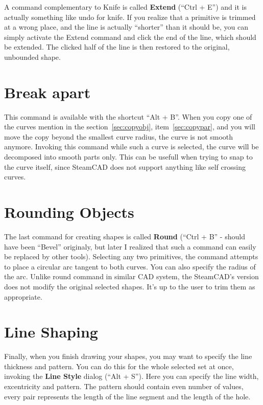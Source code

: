 A command complementary to Knife is called \textbf{Extend} (``Ctrl + E'') and it is
actually something like undo for knife. If you realize that a primitive is trimmed
at a wrong place, and the line is actually ``shorter'' than it should be, you can simply
activate the Extend command and click the end of the line, which should be extended.
The clicked half of the line is then restored to the original, unbounded shape.

\section{Break apart}
This command is available with the shortcut ``Alt + B''. When you copy one of the curves
mention in the section~\ref{sec:copyobj}, item~\ref{sec:copypar}, and you will move the
copy beyond the smallest curve radius, the curve is not smooth anymore. Invoking this
command while such a curve is selected, the curve will be decomposed into smooth parts only.
This can be usefull when trying to snap to the curve itself, since SteamCAD does not support
anything like self crossing curves.

\section{Rounding Objects}

The last command for creating shapes is called \textbf{Round} (``Ctrl + B'' - should have
been ``Bevel'' originaly, but later I realized that such a command can easily be replaced
by other tools). Selecting any two primitives, the command attempts to place a circular
arc tangent to both curves. You can also specify the radius of the arc. Unlike round
command in similar CAD system, the SteamCAD's version does not modify the original
selected shapes. It's up to the user to trim them as appropriate.

\section{Line Shaping}

Finally, when you finish drawing your shapes, you may want to specify the line
thickness and pattern. You can do this for the whole selected set at once, invoking
the \textbf{Line Style} dialog (``Alt + S''). Here you can specify the line width,
excentricity and pattern. The pattern should contain even number of values, every
pair represents the length of the line segment and the length of the hole.

